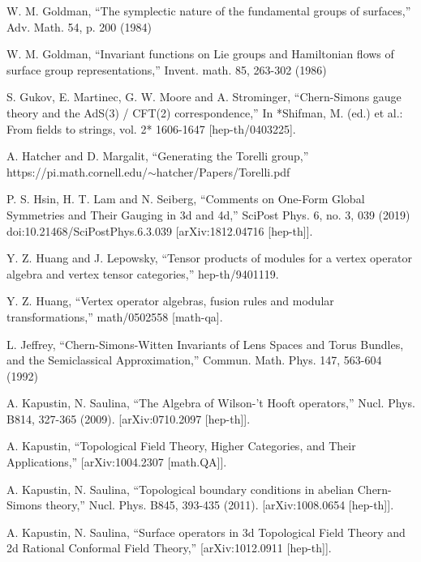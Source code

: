 \begin{enumerate}[label={[\arabic*]},leftmargin=3.2em,itemsep=2pt,topsep=4pt]
\item W. M. Goldman, “The symplectic nature of the fundamental groups of surfaces,” Adv. Math. 54, p. 200 (1984)

\item W. M. Goldman, “Invariant functions on Lie groups and Hamiltonian flows of surface group representations,” Invent. math. 85, 263-302 (1986)

\item S. Gukov, E. Martinec, G. W. Moore and A. Strominger, “Chern-Simons gauge theory and the AdS(3) / CFT(2) correspondence,” In *Shifman, M. (ed.) et al.: From fields to strings, vol. 2* 1606-1647 [hep-th/0403225].

\item A. Hatcher and D. Margalit, “Generating the Torelli group,” https://pi.math.cornell.edu/\ensuremath{\sim}hatcher/Papers/Torelli.pdf

\item P. S. Hsin, H. T. Lam and N. Seiberg, “Comments on One-Form Global Symmetries and Their Gauging in 3d and 4d,” SciPost Phys. 6, no. 3, 039 (2019) doi:10.21468/SciPostPhys.6.3.039 [arXiv:1812.04716 [hep-th]].

\item Y. Z. Huang and J. Lepowsky, “Tensor products of modules for a vertex operator algebra and vertex tensor categories,” hep-th/9401119.

\item Y. Z. Huang, “Vertex operator algebras, fusion rules and modular transformations,” math/0502558 [math-qa].

\item L. Jeffrey, “Chern-Simons-Witten Invariants of Lens Spaces and Torus Bundles, and the Semiclassical Approximation,” Commun. Math. Phys. 147, 563-604 (1992)

\item A. Kapustin, N. Saulina, “The Algebra of Wilson-’t Hooft operators,” Nucl. Phys. B814, 327-365 (2009). [arXiv:0710.2097 [hep-th]].

\item A. Kapustin, “Topological Field Theory, Higher Categories, and Their Applications,” [arXiv:1004.2307 [math.QA]].

\item A. Kapustin, N. Saulina, “Topological boundary conditions in abelian Chern-Simons theory,” Nucl. Phys. B845, 393-435 (2011). [arXiv:1008.0654 [hep-th]].

\item A. Kapustin, N. Saulina, “Surface operators in 3d Topological Field Theory and 2d Rational Conformal Field Theory,” [arXiv:1012.0911 [hep-th]].


\end{enumerate}
